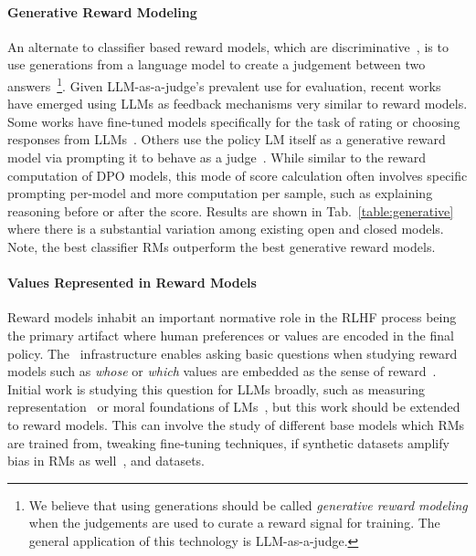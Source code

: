 
\paragraph{Generative Reward Modeling}
An alternate to classifier based reward models, which are discriminative~\citep{ng2001discriminative}, is to use generations from a language model to create a judgement between two answers~\citep{zheng2023judging}\footnote{We believe that using generations should be called \textit{generative reward modeling} when the judgements are used to curate a reward signal for training.
The general application of this technology is LLM-as-a-judge.}.
Given LLM-as-a-judge's prevalent use for evaluation, recent works have emerged using LLMs as feedback mechanisms very similar to reward models.
Some works have fine-tuned models specifically for the task of rating or choosing responses from LLMs~\citep{Jiang2023TIGERScoreTB, kim2023prometheus, zhu2023judgelm}.
Others use the policy LM itself as a generative reward model via prompting it to behave as a judge~\citep{yuan2024self,li2023generative}.
While similar to the reward computation of DPO models, this mode of score calculation often involves specific prompting per-model and more computation per sample, such as explaining reasoning before or after the score.
Results are shown in Tab.~\ref{table:generative} where there is a substantial variation among existing open and closed models.
Note, the best classifier RMs outperform the best generative reward models.

\paragraph{Values Represented in Reward Models}
Reward models inhabit an important normative role in the RLHF process being the primary artifact where human preferences or values are encoded in the final policy.
The \name~infrastructure enables asking basic questions when studying reward models such as \emph{whose} or \emph{which} values are embedded as the sense of reward~\citep{lambert2023history}.
Initial work is studying this question for LLMs broadly, such as measuring representation~\citep{durmus2023towards,ryan2024unintended} or moral foundations of LMs~\citep{abdulhai2023moral}, but this work should be extended to reward models. 
This can involve the study of different base models which RMs are trained from, tweaking fine-tuning techniques, if synthetic datasets amplify bias in RMs as well~\citep{wyllie2024fairness}, and datasets.


